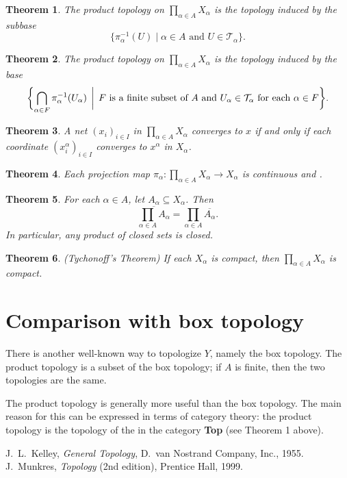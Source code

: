 \documentclass[12pt]{article}
\def\T{{\mathcal T}}
\def\closure{\overline}
\newtheorem{theorem}{Theorem}
\begin{document}
\begin{theorem}
The product topology on $\prod_{\alpha\in A}X_\alpha$
is the topology induced by the subbase
\[
  \{ \pi_\alpha^{-1}(U)\mid \alpha\in A\mbox{ and }U\in \T_\alpha \}.
\]
\end{theorem}

\begin{theorem}
The product topology on $\prod_{\alpha\in A}X_\alpha$
is the topology induced by the base
\[
  \biggl\{ \bigcap_{\alpha\in F} \pi_\alpha^{-1}(U_\alpha)
  \,\biggm|\,
  F\mbox{ is a finite subset of }A
  \mbox{ and }U_\alpha\in\T_\alpha\mbox{ for each }\alpha\in F\biggr\}.
\]
\end{theorem}

\begin{theorem}
A net $(x_i)_{i \in I}$ in $\prod_{\alpha\in A}X_{\alpha}$ converges to $x$ if and only if each coordinate $(x_i^{\alpha})_{i \in I}$ converges to $x^{\alpha}$ in $X_{\alpha}$.
\end{theorem}

\begin{theorem}
Each projection map $\pi_\alpha\colon\prod_{\alpha\in A}X_\alpha\to X_\alpha$
is continuous and .
\end{theorem}

\begin{theorem}
For each $\alpha\in A$, let $A_\alpha\subseteq X_\alpha$.
Then
\[
  \closure{\prod_{\alpha\in A}A_\alpha}=\prod_{\alpha\in A}\closure{A_\alpha}.
\]
In particular, any product of closed sets is closed.
\end{theorem}

\begin{theorem}
{\PMlinkescapetext{\rm} (Tychonoff's Theorem)}
If each $X_\alpha$ is compact, then $\prod_{\alpha\in A}X_\alpha$ is compact.
\end{theorem}

\section*{Comparison with box topology}

There is another well-known way to topologize $Y$, namely the box topology.
The product topology is a subset of the box topology;
if $A$ is finite, then the two topologies are the same.

The product topology is generally more useful than the box topology.
The main reason for this can be expressed in terms of category theory:
the product topology is the topology of the
in the category \textbf{Top} (see Theorem 1 above).

\begin{thebibliography}{9}
 J.~L.~Kelley, \emph{General Topology},
 D.~van Nostrand Company, Inc., 1955.
 J.~Munkres, \emph{Topology} (2nd edition),
 Prentice Hall, 1999.
\end{thebibliography}
\end{document}
